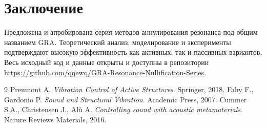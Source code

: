 \documentclass[a4paper,12pt]{article}
\begin{document}
\section{Заключение}
Предложена и апробирована серия методов аннулирования резонанса под общим названием GRA. Теоретический анализ, моделирование и эксперименты подтверждают высокую эффективность как активных, так и пассивных вариантов. Весь исходный код и данные открыты и доступны в репозитории \url{https://github.com/qqewq/GRA-Resonance-Nullification-Series}.


\begin{thebibliography}{9}
 Preumont A. \emph{Vibration Control of Active Structures}. Springer, 2018.
 Fahy F., Gardonio P. \emph{Sound and Structural Vibration}. Academic Press, 2007.
 Cummer S.A., Christensen J., Alù A. \emph{Controlling sound with acoustic metamaterials}. Nature Reviews Materials, 2016.
\end{thebibliography}
\end{document}

